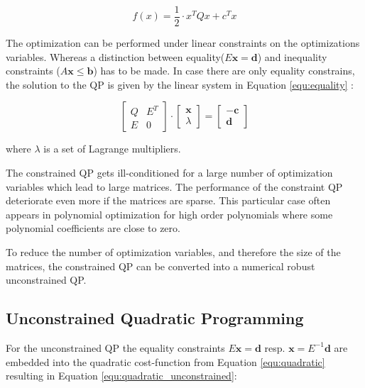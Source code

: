 \begin{equation}
 f(x)  = \frac{1}{2} \cdot x^T Q x + c^T x 
\label{equ:quadratic}
\end{equation}

The optimization can be performed under linear constraints on the optimizations variables. Whereas a distinction between equality($ E\mathbf{x} = \mathbf d $) and inequality constraints ($ A\mathbf{x} \leq \mathbf b $) has to be made. 
In case there are only equality constrains, the solution to the QP is given by the linear system in Equation \ref{equ:equality} :


\begin{equation}
\begin{bmatrix}
   Q & E^T \\
   E & 0
\end{bmatrix} 
\cdot
\begin{bmatrix}
   \mathbf x \\
   \lambda
\end{bmatrix}
= 
\begin{bmatrix}
   -\mathbf c \\
   \mathbf d
\end{bmatrix}
\label{equ:equality}
\end{equation}


where $\lambda$ is a set of Lagrange multipliers.

The constrained QP gets ill-conditioned for a large number of optimization variables which lead to large matrices. The performance of the constraint QP deteriorate even more if the matrices are sparse. This particular case often appears in polynomial optimization for high order polynomials where some polynomial coefficients are close to zero. \newline

To reduce the number of optimization variables, and therefore the size of the matrices, the constrained QP can be converted into a numerical robust unconstrained QP.

\subsection{Unconstrained Quadratic Programming}

For the unconstrained QP the equality constraints $E \mathbf{x} = \mathbf{d}$ resp. $\mathbf{x} = E^{-1} \mathbf{d}$ are embedded into the quadratic cost-function from Equation \ref{equ:quadratic} resulting in Equation \ref{equ:quadratic_unconstrained}:

